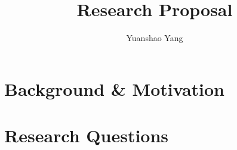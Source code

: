 \documentclass[8pt]{article}
\title{Research Proposal}.
\author{Yuanshao Yang}
\affil{Department of Mechanical Engineering, Univereity of Michigan}
\date{}
\begin{document}
\maketitle


\section{Background \& Motivation}



\section{Research Questions}
\end{document}
